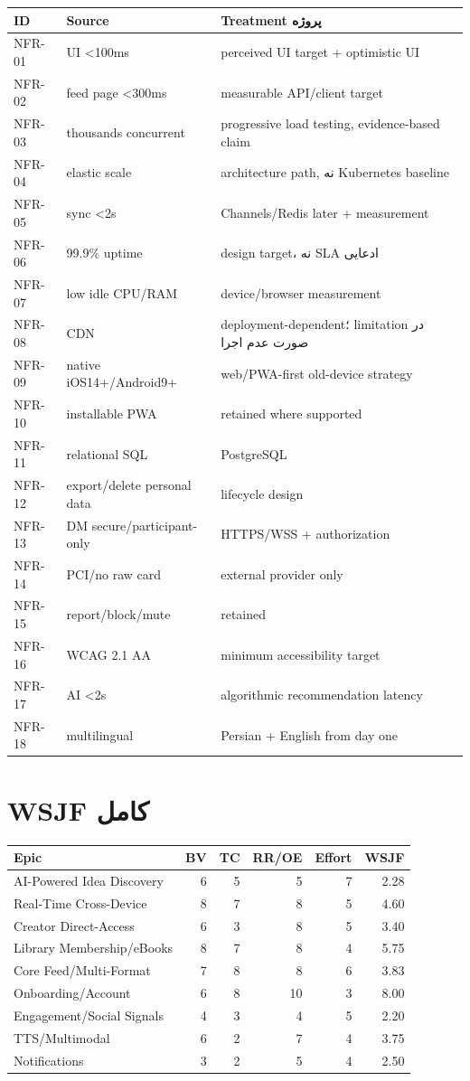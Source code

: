 \begin{longtable}{p{1.6cm}p{4cm}p{7.3cm}}
\toprule
ID & Source & Treatment پروژه \\
\midrule
NFR-01 & UI <100ms & perceived UI target + optimistic UI \\
NFR-02 & feed page <300ms & measurable API/client target \\
NFR-03 & thousands concurrent & progressive load testing, evidence-based claim \\
NFR-04 & elastic scale & architecture path, نه Kubernetes baseline \\
NFR-05 & sync <2s & Channels/Redis later + measurement \\
NFR-06 & 99.9\% uptime & design target، نه SLA ادعایی \\
NFR-07 & low idle CPU/RAM & device/browser measurement \\
NFR-08 & CDN & deployment-dependent؛ limitation در صورت عدم اجرا \\
NFR-09 & native iOS14+/Android9+ & web/PWA-first old-device strategy \\
NFR-10 & installable PWA & retained where supported \\
NFR-11 & relational SQL & PostgreSQL \\
NFR-12 & export/delete personal data & lifecycle design \\
NFR-13 & DM secure/participant-only & HTTPS/WSS + authorization \\
NFR-14 & PCI/no raw card & external provider only \\
NFR-15 & report/block/mute & retained \\
NFR-16 & WCAG 2.1 AA & minimum accessibility target \\
NFR-17 & AI <2s & algorithmic recommendation latency \\
NFR-18 & multilingual & Persian + English from day one \\
\bottomrule
\end{longtable}

\section{WSJF کامل}

\begin{longtable}{p{5.5cm}rrrrr}
\toprule
Epic & BV & TC & RR/OE & Effort & WSJF \\
\midrule
AI-Powered Idea Discovery & 6 & 5 & 5 & 7 & 2.28 \\
Real-Time Cross-Device & 8 & 7 & 8 & 5 & 4.60 \\
Creator Direct-Access & 6 & 3 & 8 & 5 & 3.40 \\
Library Membership/eBooks & 8 & 7 & 8 & 4 & 5.75 \\
Core Feed/Multi-Format & 7 & 8 & 8 & 6 & 3.83 \\
Onboarding/Account & 6 & 8 & 10 & 3 & 8.00 \\
Engagement/Social Signals & 4 & 3 & 4 & 5 & 2.20 \\
TTS/Multimodal & 6 & 2 & 7 & 4 & 3.75 \\
Notifications & 3 & 2 & 5 & 4 & 2.50 \\
\bottomrule
\end{longtable}

